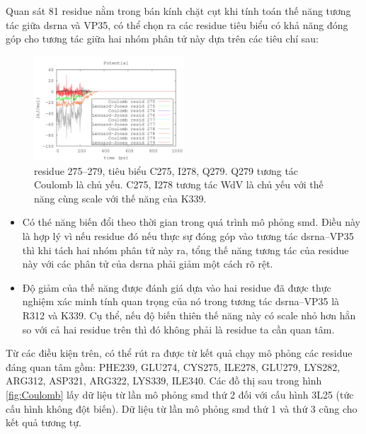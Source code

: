 \documentclass[12pt,a4paper,reqno, oneside]{book}
\begin{document}
Quan sát 81 \gls{residue} nằm trong bán kính chặt cụt khi tính toán thế năng tương tác giữa \gls{dsrna} và VP35, có thể chọn ra các \gls{residue} tiêu biểu có khả năng đóng góp cho tương tác giữa hai nhóm phân tử này dựa trên các tiêu chí sau:
\begin{figure}
\begin{center}
\includegraphics[width=0.5\textwidth,natwidth=610,natheight=642]{275-279}
\end{center}
\caption{\gls{residue} 275--279, tiêu biểu C275, I278, Q279. Q279 tương tác Coulomb là chủ yếu. C275, I278 tương tác WdV là chủ yếu với thế năng cùng scale với thế năng của K339.}
\label{fig:WdV}
\end{figure}
\begin{itemize}
\item Có thé năng biến đổi theo thời gian trong quá trình mô phỏng \gls{smd}. Điều này là hợp lý vì nếu \gls{residue} đó nếu thực sự đóng góp vào tương tác \gls{dsrna}--VP35 thì khi tách hai nhóm phân tử này ra, tổng thế năng tương tác của \gls{residue} này với các phân tử của \gls{dsrna} phải giảm một cách rõ rệt.
\item Độ giảm của thế năng được đánh giá dựa vào hai \gls{residue} đã được thực nghiệm xác minh tính quan trọng của nó trong tương tác \gls{dsrna}--VP35 là R312 và K339\cite{Leung2010}. Cụ thể, nếu độ biến thiên thế năng này có scale nhỏ hơn hẳn so với cả hai \gls{residue} trên thì đó không phải là \gls{residue} ta cần quan tâm.
\end{itemize}
Từ các điều kiện trên, có thể rút ra được từ kết quả chạy mô phỏng các \gls{residue} đáng quan tâm gồm: PHE239, GLU274, CYS275, ILE278, GLU279, LYS282, ARG312, ASP321, ARG322, LYS339, ILE340. Các đồ thị sau trong hình \ref{fig:Coulomb} lấy dữ liệu từ lần mô phỏng \gls{smd} thứ 2 đối với cấu hình 3L25 (tức cấu hình không đột biến). Dữ liệu từ lần mô phỏng \gls{smd} thứ 1 và thứ 3 cũng cho kết quả tương tự.
\end{document}
